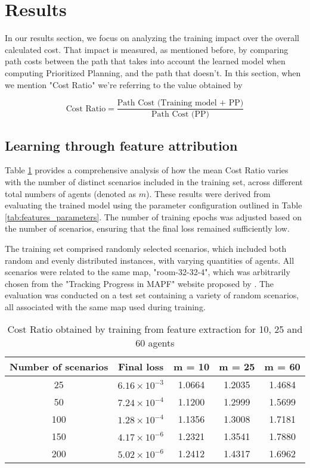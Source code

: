 \section{Results}

In our results section, we focus on analyzing the training impact over the overall calculated cost. That impact is measured, as mentioned before, by comparing path costs between the path that takes into account the learned model when computing Prioritized Planning, and the path that doesn't. In this section, when we mention "Cost Ratio" we're referring to the value obtained by

\[
\text{Cost Ratio} = \frac{\text{Path Cost (Training model + PP)}}{\text{Path Cost (PP)}} \tag{18}
\]

\subsection{Learning through feature attribution}

Table \ref{features_test} provides a comprehensive analysis of how the mean Cost Ratio varies with the number of distinct scenarios included in the training set, across different total numbers of agents (denoted as $m$). These results were derived from evaluating the trained model using the parameter configuration outlined in Table \ref{tab:features_parameters}. The number of training epochs was adjusted based on the number of scenarios, ensuring that the final loss remained sufficiently low.

The training set comprised randomly selected scenarios, which included both random and evenly distributed instances, with varying quantities of agents. All scenarios were related to the same map, "room-32-32-4", which was arbitrarily chosen from the "Tracking Progress in MAPF" website proposed by \cite{shenTrackingProgressMultiAgent2023}. The evaluation was conducted on a test set containing a variety of random scenarios, all associated with the same map used during training.

\begin{table}[!ht]
\begin{center}
\caption{Cost Ratio obtained by training from feature extraction for 10, 25 and 60 agents}
\label{features_test}
\begin{tabular}{||c c c c c||}  
  \hline 
  Number of scenarios & Final loss & m = 10 & m = 25 & m = 60 \\ [0.5ex]  
  \hline\hline 
  25 & $6.16 \times 10^{-3}$ & 1.0664 & 1.2035 & 1.4684  \\ 
  \hline
  50 & $7.24 \times10^{-4}$ & 1.1200 & 1.2999 & 1.5699  \\  
  \hline 
  100 & $1.28 \times 10^{-4}$ & 1.1356 & 1.3008 & 1.7181  \\ 
  \hline
  150 & $4.17 \times 10^{-6}$ & 1.2321 & 1.3541 & 1.7880 \\
  \hline 
  200 & $5.02 \times 10^{-6}$ & 1.2412 & 1.4317 & 1.6962 \\ [1ex]  
  \hline 
\end{tabular}
\end{center}
\end{table}


